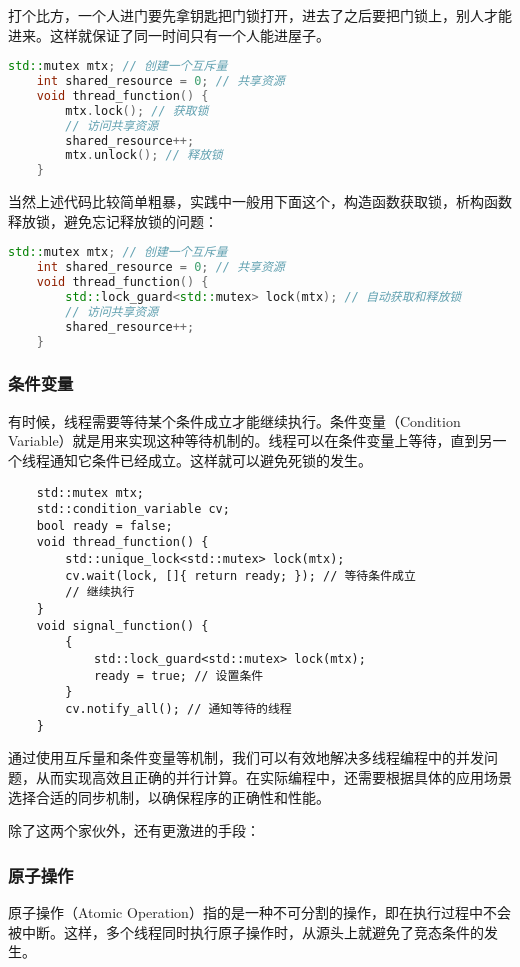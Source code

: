 打个比方，一个人进门要先拿钥匙把门锁打开，进去了之后要把门锁上，别人才能进来。这样就保证了同一时间只有一个人能进屋子。

\begin{lstlisting}[language=C++]
    std::mutex mtx; // 创建一个互斥量
    int shared_resource = 0; // 共享资源
    void thread_function() {
        mtx.lock(); // 获取锁
        // 访问共享资源
        shared_resource++;
        mtx.unlock(); // 释放锁
    }
\end{lstlisting}
当然上述代码比较简单粗暴，实践中一般用下面这个，构造函数获取锁，析构函数释放锁，避免忘记释放锁的问题：
\begin{lstlisting}[language=C++]
    std::mutex mtx; // 创建一个互斥量
    int shared_resource = 0; // 共享资源
    void thread_function() {
        std::lock_guard<std::mutex> lock(mtx); // 自动获取和释放锁
        // 访问共享资源
        shared_resource++;
    }
\end{lstlisting}

\subsubsection{条件变量}

有时候，线程需要等待某个条件成立才能继续执行。条件变量（Condition Variable）就是用来实现这种等待机制的。线程可以在条件变量上等待，直到另一个线程通知它条件已经成立。这样就可以避免死锁的发生。

\begin{lstlisting}
    std::mutex mtx;
    std::condition_variable cv;
    bool ready = false;
    void thread_function() {
        std::unique_lock<std::mutex> lock(mtx);
        cv.wait(lock, []{ return ready; }); // 等待条件成立
        // 继续执行
    }
    void signal_function() {
        {
            std::lock_guard<std::mutex> lock(mtx);
            ready = true; // 设置条件
        }
        cv.notify_all(); // 通知等待的线程
    }
\end{lstlisting}

通过使用互斥量和条件变量等机制，我们可以有效地解决多线程编程中的并发问题，从而实现高效且正确的并行计算。在实际编程中，还需要根据具体的应用场景选择合适的同步机制，以确保程序的正确性和性能。

除了这两个家伙外，还有更激进的手段：
\subsubsection{原子操作}

原子操作（Atomic Operation）指的是一种不可分割的操作，即在执行过程中不会被中断。这样，多个线程同时执行原子操作时，从源头上就避免了竞态条件的发生。

